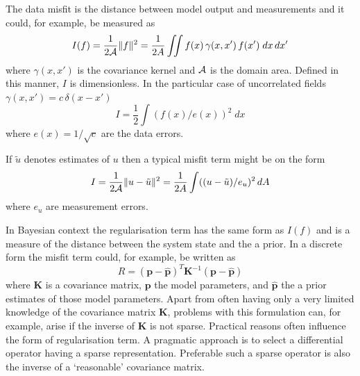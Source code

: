 \documentclass[10pt,a4paper]{book}
\begin{document}
The data misfit is the distance between model output and measurements and
it could, for example, be measured as
\begin{equation}
I(f) = \frac{1}{2 \cal{A}} \| f \|^2 = \frac{1}{2A} \iint  f(x) \, \gamma(x,x') \, f(x')\; dx \, dx'
\label{eq:O1}
\end{equation}
where $\gamma(x,x')$ is the covariance kernel and $\cal{A}$ is the
domain area. Defined in this manner, $I$ is dimensionless. In the
particular case of uncorrelated fields
$\gamma(x,x')= c \,\delta(x-x')$
\begin{equation}
I =\frac{1}{2} \int  (f(x)/e(x))^2\; dx 
\label{eq:O2}
\end{equation}
where $e(x)=1/\sqrt{c}$ are the data errors. 

If $\tilde{u}$ denotes estimates of $u$ then a typical misfit term might be on the form
\[
I= \frac{1}{2 \cal{A}} \| u-\tilde{u} \|^2 = \frac{1}{2A} \int  ((u-\tilde{u})/e_u)^2 \, dA
\]
where $e_u$ are measurement errors.

In Bayesian context the regularisation term has the same form as
$I(f)$ and is a measure of the distance between the system state and
the a prior. In a discrete form the misfit term could, for example, be
written as
\[
R=(\bm{p}-\hat{\bm{p}})^T \bm{K}^{-1}  (\bm{p}-\hat{\bm{p}}) 
\]
where $\bm{K}$ is a covariance matrix, $\bm{p}$ the model parameters,
and $\hat{\bm{p}}$ the a prior estimates of those model
parameters. Apart from often having only a very limited knowledge of
the covariance matrix $\bm{K}$, problems with this formulation can,
for example, arise if the inverse of $\bm{K}$ is not sparse. Practical
reasons often influence the form of regularisation term. A pragmatic
approach is to select a differential operator having a sparse
representation. Preferable such a sparse operator is also the inverse
of a `reasonable' covariance matrix.
\end{document}
